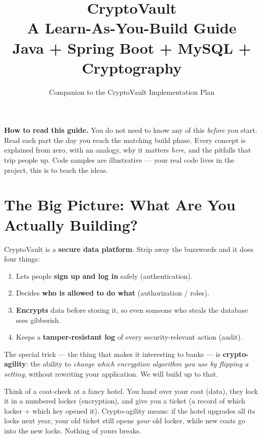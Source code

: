 \documentclass[11pt,a4paper]{article}
\title{\vspace{-1cm}\textbf{CryptoVault}\\[4pt]
\large A Learn-As-You-Build Guide\\[2pt]
\normalsize Java + Spring Boot + MySQL + Cryptography}
\author{Companion to the CryptoVault Implementation Plan}
\date{}
\begin{document}
\maketitle
\thispagestyle{fancy}

\begin{tcolorbox}[colback=accent!5,colframe=accent!50]
\textbf{How to read this guide.} You do not need to know any of this \emph{before} you start.
Read each part the day you reach the matching build phase. Every concept is explained from
zero, with an analogy, why it matters \emph{here}, and the pitfalls that trip people up.
Code samples are illustrative — your real code lives in the project, this is to teach the ideas.
\end{tcolorbox}

\tableofcontents
\newpage

\section{The Big Picture: What Are You Actually Building?}

CryptoVault is a \textbf{secure data platform}. Strip away the buzzwords and it does four things:

\begin{enumerate}[leftmargin=*]
  \item Lets people \textbf{sign up and log in} safely (authentication).
  \item Decides \textbf{who is allowed to do what} (authorization / roles).
  \item \textbf{Encrypts} data before storing it, so even someone who steals the database sees gibberish.
  \item Keeps a \textbf{tamper-resistant log} of every security-relevant action (audit).
\end{enumerate}

The special trick — the thing that makes it interesting to banks — is \textbf{crypto-agility}:
the ability to \emph{change which encryption algorithm you use by flipping a setting}, without
rewriting your application. We will build up to that.

\begin{analogy}
Think of a coat-check at a fancy hotel. You hand over your coat (data), they lock it in a
numbered locker (encryption), and give you a ticket (a record of which locker + which key opened
it). Crypto-agility means: if the hotel upgrades all its locks next year, your old ticket still
opens \emph{your} old locker, while new coats go into the new locks. Nothing of yours breaks.
\end{analogy}
\end{document}
